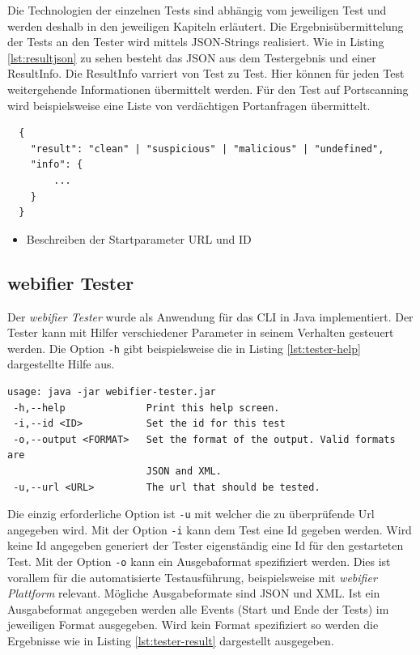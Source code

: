 Die Technologien der einzelnen Tests sind abhängig vom jeweiligen Test und werden deshalb in den
jeweiligen Kapiteln erläutert. Die Ergebnisübermittelung der Tests an den Tester wird mittels
\ac{JSON}-Strings realisiert. Wie in Listing \ref{lst:resultjson} zu sehen besteht das \ac{JSON} aus dem
Testergebnis und einer ResultInfo. Die ResultInfo varriert von Test zu Test. Hier können für jeden Test weitergehende Informationen übermittelt werden. Für den Test auf Portscanning wird beispielsweise eine Liste von verdächtigen Portanfragen übermittelt.

\begin{scriptsize}
\begin{lstlisting}
  {
  	"result": "clean" | "suspicious" | "malicious" | "undefined",
  	"info": {
  		...
  	}
  }
\end{lstlisting}
\end{scriptsize}

\begin{itemize}
  \item Beschreiben der Startparameter URL und ID
\end{itemize}

\subsection{webifier Tester}

Der \textit{webifier Tester} wurde als Anwendung für das \ac{CLI} in Java implementiert. Der Tester
kann mit Hilfer verschiedener Parameter in seinem Verhalten gesteuert werden. Die Option \lstinline[style=eclipse]{-h} gibt beispielsweise die in Listing \ref{lst:tester-help} dargestellte Hilfe aus.

\begin{scriptsize}
\begin{lstlisting}
usage: java -jar webifier-tester.jar
 -h,--help              Print this help screen.
 -i,--id <ID>           Set the id for this test
 -o,--output <FORMAT>   Set the format of the output. Valid formats are
                        JSON and XML.
 -u,--url <URL>         The url that should be tested.
\end{lstlisting}
\end{scriptsize}

Die einzig erforderliche Option ist \lstinline[style=eclipse]{-u} mit welcher die zu überprüfende Url angegeben wird. Mit der Option \lstinline[style=eclipse]{-i} kann dem Test eine Id gegeben werden. Wird keine Id angegeben generiert der Tester eigenständig eine Id für den gestarteten Test. Mit der Option \lstinline[style=eclipse]{-o} kann ein Ausgebaformat spezifiziert werden. Dies ist vorallem für die automatisierte Testausführung, beispielsweise mit \textit{webifier Plattform} relevant. Mögliche Ausgabeformate sind \ac{JSON} und \ac{XML}. Ist ein Ausgabeformat angegeben werden alle Events (Start und Ende der Tests) im jeweiligen Format ausgegeben. Wird kein Format spezifiziert so werden die Ergebnisse wie in Listing \ref{lst:tester-result} dargestellt ausgegeben.

